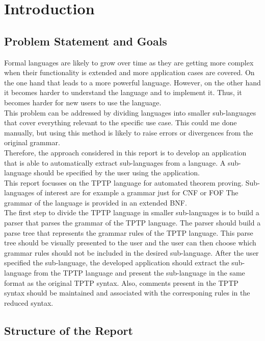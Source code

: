 
\chapter{Introduction}\label{cha:Introduction}

\section{Problem Statement and Goals}\label{sec:Aufgabenstellung}
Formal languages are likely to grow over time as they are getting more complex when their functionality is extended and more application cases are covered.
On the one hand that leads to a more powerful language.
However, on the other hand it becomes harder to understand the language and to implement it.
Thus, it becomes harder for new users to use the language.\\
This problem can be addressed by dividing languages into smaller sub-languages that cover everything relevant to the specific use case. 
This could me done manually, but using this method is likely to raise errors or divergences from the original grammar.\\
Therefore, the approach considered in this report is to develop an application that is able to automatically extract sub-languages from a language.
A sub-language should be specified by the user using the application.\\
This report focusses on the \acf{TPTP} language for automated theorem proving.
Sub-languages of interest are for example a grammar just for \ac{CNF} or \ac{FOF}
The grammar of the language is provided in an extended \acf{BNF}.\\
The first step to divide the \ac{TPTP} language in smaller sub-languages is to build a parser that parses the grammar of the \ac{TPTP} language.
The parser should build a parse tree that represents the grammar rules of the \ac{TPTP} language.
This parse tree should be visually presented to the user and the user can then choose which grammar rules should not be included in the desired sub-language.
After the user specified the sub-language, the developed application should extract the sub-language from the \ac{TPTP} language and present the sub-language in the same format as the original \ac{TPTP} syntax.
Also, comments present in the \ac{TPTP} syntax should be maintained and associated with the corresponing rules in the reduced syntax.
\section{Structure of the Report}\label{sec:Structure}
